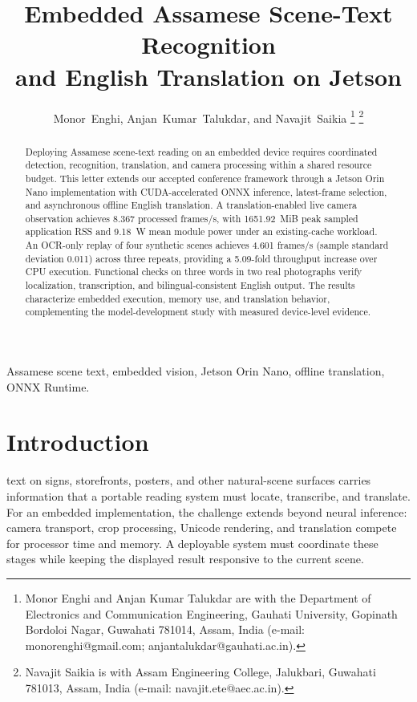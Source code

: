 \documentclass[cspaper,journal,10pt]{IEEEtran}
\begin{document}
\title{Embedded Assamese Scene-Text Recognition\\and English Translation on Jetson}
\author{Monor~Enghi, Anjan~Kumar~Talukdar, and Navajit~Saikia%
\thanks{Monor Enghi and Anjan Kumar Talukdar are with the Department of Electronics and Communication Engineering, Gauhati University, Gopinath Bordoloi Nagar, Guwahati 781014, Assam, India (e-mail: monorenghi@gmail.com; anjantalukdar@gauhati.ac.in).}%
\thanks{Navajit Saikia is with Assam Engineering College, Jalukbari, Guwahati 781013, Assam, India (e-mail: navajit.ete@aec.ac.in).}}
\maketitle
\begin{abstract}
Deploying Assamese scene-text reading on an embedded device requires coordinated detection, recognition, translation, and camera processing within a shared resource budget. This letter extends our accepted conference framework through a Jetson Orin Nano implementation with CUDA-accelerated ONNX inference, latest-frame selection, and asynchronous offline English translation. A translation-enabled live camera observation achieves 8.367 processed frames/s, with 1651.92~MiB peak sampled application RSS and 9.18~W mean module power under an existing-cache workload. An OCR-only replay of four synthetic scenes achieves 4.601 frames/s (sample standard deviation 0.011) across three repeats, providing a 5.09-fold throughput increase over CPU execution. Functional checks on three words in two real photographs verify localization, transcription, and bilingual-consistent English output. The results characterize embedded execution, memory use, and translation behavior, complementing the model-development study with measured device-level evidence.
\end{abstract}
\begin{IEEEkeywords}
Assamese scene text, embedded vision, Jetson Orin Nano, offline translation, ONNX Runtime.
\end{IEEEkeywords}

\section{Introduction}
 text on signs, storefronts, posters, and other natural-scene surfaces carries information that a portable reading system must locate, transcribe, and translate. For an embedded implementation, the challenge extends beyond neural inference: camera transport, crop processing, Unicode rendering, and translation compete for processor time and memory. A deployable system must coordinate these stages while keeping the displayed result responsive to the current scene.
\end{document}
